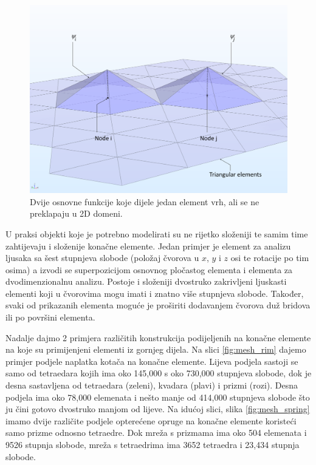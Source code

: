 \documentclass[a4paper,twoside,12pt]{memoir} %
\begin{document}
\begin{figure}[h!t]
\begin{center}
\includegraphics[scale=0.42]{pictures/chapter_fem/base-functions-no-overlap.png}
\caption{Dvije osnovne funkcije koje dijele jedan element vrh, ali se ne preklapaju u 2D domeni. \cite{comsol_fem_general}}
\label{fig:base_triangle_elements}
\end{center}
\end{figure}

\par
U praksi objekti koje je potrebno modelirati su ne rijetko složeniji te samim time zahtijevaju i složenije konačne elemente. Jedan primjer je element za analizu ljusaka sa šest stupnjeva slobode (položaj čvorova u $x$, $y$ i $z$ osi te rotacije po tim osima) a izvodi se superpozicijom osnovnog pločastog elementa i elementa za dvodimenzionalnu analizu. Postoje i složeniji dvostruko zakrivljeni ljuskasti elementi koji u čvorovima mogu imati i znatno više stupnjeva slobode. Također, svaki od prikazanih elementa moguće je proširiti dodavanjem čvorova duž bridova ili po površini elementa. \par

Nadalje dajmo 2 primjera različitih konstrukcija podijeljenih na konačne elemente na koje su primijenjeni elementi iz gornjeg dijela. Na slici \ref{fig:mesh_rim} dajemo primjer podjele naplatka kotača na konačne elemente. Lijeva podjela sastoji se samo od tetraedara kojih ima oko 145,000 s oko 730,000 stupnjeva slobode, dok je desna sastavljena od tetraedara (zeleni), kvadara (plavi) i prizmi (rozi). Desna podjela ima oko 78,000 elemenata i nešto manje od 414,000 stupnjeva slobode što ju čini gotovo dvostruko manjom od lijeve. Na idućoj slici, slika \ref{fig:mesh_spring} imamo dvije različite podjele opterećene opruge na konačne elemente koristeći samo prizme odnosno tetraedre. Dok mreža s prizmama ima oko 504 elemenata i 9526 stupnja slobode, mreža s tetraedrima ima 3652 tetraedra i 23,434 stupnja slobode.
\end{document}
